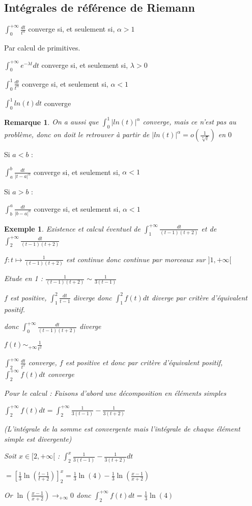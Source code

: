 \documentclass[a4paper,12pt]{book}
\newcommand{\Prop}[2]{\begin{tcolorbox}[sharp corners, colback=white,colframe=red!90!black!75, title=Proposition : #1]#2\end{tcolorbox}}
\newcommand{\Pre}[1]{\begin{tcolorbox}[sharp corners, colback=white,colframe=green!60!green!30!black!75, title=Preuve]#1\end{tcolorbox}}
\newtheorem{Exe}{Exemple}[section]
\newtheorem{Rem}{Remarque}[section]
\begin{document}
\subsection{Intégrales de référence de Riemann}
\Prop{}{$\int_0^{+\infty}\frac{dt}{t^\alpha}$ converge si, et seulement si, $\alpha>1$}
\Pre{Par calcul de primitives.}
\Prop{}{$\int_0^{+\infty}e^{-\lambda t}dt$ converge si, et seulement si, $\lambda>0$}
\Prop{}{$\int_0^1\frac{dt}{t^\alpha}$ converge si, et seulement si, $\alpha<1$}
\Prop{}{$\int_0^1ln(t)dt$ converge}
\begin{Rem}
On a aussi que $\int_0^1\vert ln(t)\vert^\alpha$ converge, mais ce n'est pas au problème, donc on doit le retrouver à partir de $\vert ln(t)\vert^\alpha =o\left(\frac{1}{\sqrt[\alpha]{t}}\right)$ en $0$
\end{Rem}
\Prop{}{Si $a<b$ : \par $\int_a^b\frac{dt}{\vert t-a\vert^\alpha}$ converge si, et seulement si, $\alpha<1$}
\Prop{}{Si $a>b$ : \par $\int_b^a\frac{dt}{\vert b-a\vert^\alpha}$ converge si, et seulement si, $\alpha<1$}
\begin{Exe}
Existence et calcul éventuel de $\int_1^{+\infty}\frac{dt}{(t-1)(t+2)}$ et de $\int_2^{+\infty}\frac{dt}{(t-1)(t+2)}$ \par $f:t\mapsto \frac{1}{(t-1)(t+2)}$ est continue donc continue par morceaux sur $]1,+\infty[$ \par Etude en 1 : $\frac{1}{(t-1)(t+2)}\sim\frac{1}{3(t-1)}$ \par $f$ est positive, $\int_1^2\frac{dt}{t-1}$ diverge donc $\int_1^2f(t)dt$ diverge par critère d'équivalent positif. \par donc $\int_0^{+\infty}\frac{dt}{(t-1)(t+2)}$ diverge
\par $f(t)\sim_{+\infty}\frac{1}{t^2}$ \par $\int_2^{+\infty}\frac{dt}{t^2}$ converge, $f$ est positive et donc par critère d'équivalent positif, $\int_2^{+\infty}f(t)dt$ converge \par Pour le calcul : Faisons d'abord une décomposition en éléments simples \par $\int_2^{+\infty}f(t)dt = \int_2^{+\infty} \frac{1}{3(t-1)}-\frac{1}{3(t+2)}$ \par (L'intégrale de la somme est convergente mais l'intégrale de chaque élément simple est divergente) \par Soit $x\in[2,+\infty[$ : $\int_2^x\frac{1}{3(t-1)}-\frac{1}{3(t+2)}dt$ \par $=\left[\frac{1}{3}\ln\left(\frac{t-1}{t+2}\right)\right]_2^x = \frac{1}{3}\ln(4)-\frac{1}{3}\ln\left(\frac{x-1}{x+2}\right)$ \par Or $\ln\left(\frac{x-1}{x+2}\right)\to_{+\infty}0$ donc $\int_2^{+\infty}f(t)dt =\frac{1}{3}\ln(4)$
\end{Exe}
\end{document}
